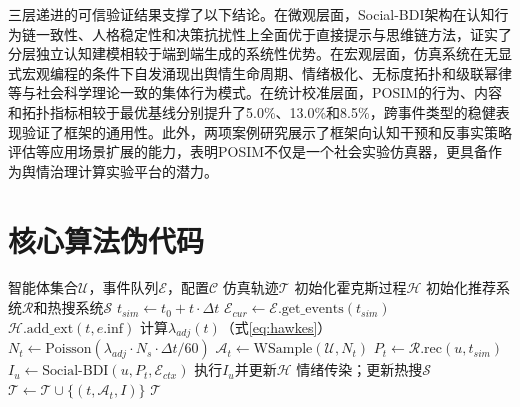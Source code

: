 \documentclass[a4paper,fleqn]{cas-dc}
\begin{document}
三层递进的可信验证结果支撑了以下结论。在微观层面，Social-BDI架构在认知行为链一致性、人格稳定性和决策抗扰性上全面优于直接提示与思维链方法，证实了分层独立认知建模相较于端到端生成的系统性优势。在宏观层面，仿真系统在无显式宏观编程的条件下自发涌现出舆情生命周期、情绪极化、无标度拓扑和级联幂律等与社会科学理论一致的集体行为模式。在统计校准层面，POSIM的行为、内容和拓扑指标相较于最优基线分别提升了5.0\%、13.0\%和8.5\%，跨事件类型的稳健表现验证了框架的通用性。此外，两项案例研究展示了框架向认知干预和反事实策略评估等应用场景扩展的能力，表明POSIM不仅是一个社会实验仿真器，更具备作为舆情治理计算实验平台的潜力。




\appendix

\section{核心算法伪代码}

\noindent
\begin{minipage}[t]{\columnwidth}
\begin{algorithm}[H]
\caption{POSIM仿真主循环}
\label{alg:main}
\begin{algorithmic}[1]
\REQUIRE 智能体集合$\mathcal{U}$，事件队列$\mathcal{E}$，配置$\mathcal{C}$
\ENSURE 仿真轨迹$\mathcal{T}$
\STATE 初始化霍克斯过程$\mathcal{H}$
\STATE 初始化推荐系统$\mathcal{R}$和热搜系统$\mathcal{S}$
 \STATE $t_{sim} \leftarrow t_0 + t \cdot \Delta t$
 \STATE $\mathcal{E}_{cur} \leftarrow \mathcal{E}.\text{get\_events}(t_{sim})$
 \STATE $\mathcal{H}.\text{add\_ext}(t, e.\text{inf})$
 \ENDFOR
 \STATE 计算$\lambda_{adj}(t)$（式\ref{eq:hawkes}）
 \STATE $N_t \!\leftarrow\! \text{Poisson}(\lambda_{adj} \!\cdot\! N_{s} \!\cdot\! \Delta t / 60)$
 \STATE $\mathcal{A}_t \leftarrow \text{WSample}(\mathcal{U}, N_t)$
 \STATE $P_t \leftarrow \mathcal{R}.\text{rec}(u, t_{sim})$
 \STATE $I_u \leftarrow \text{Social-BDI}(u, P_t, \mathcal{E}_{ctx})$
 \STATE 执行$I_u$并更新$\mathcal{H}$
 \ENDFOR
 \STATE 情绪传染；更新热搜$\mathcal{S}$
 \STATE $\mathcal{T} \leftarrow \mathcal{T} \cup \{(t, \mathcal{A}_t, I)\}$
\ENDFOR
\RETURN $\mathcal{T}$
\end{algorithmic}
\end{algorithm}
\end{minipage}
\end{document}
